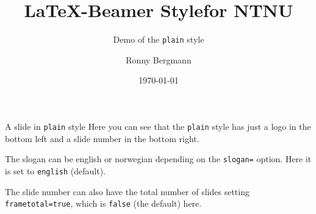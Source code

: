 \documentclass[aspectratio=169]{beamer}
\title{\LaTeX{}-Beamer Stylefor NTNU}
\subtitle{Demo of the  \texttt{plain} style}
\author{Ronny Bergmann}
\date{\today}
\begin{document}
	\maketitle
    \begin{frame}[fragile]{A slide in \texttt{plain} style}
        Here you can see that the \texttt{plain} style has just a logo in the bottom left and a slide number in the bottom right.

        The slogan can be english or norwegian depending on the \lstinline!slogan=! option. Here it is set to \lstinline!english! (default).

        The slide number can also have the total number of slides setting \lstinline!frametotal=true!, which is \lstinline!false! (the default) here.
    \end{frame}
\end{document}
